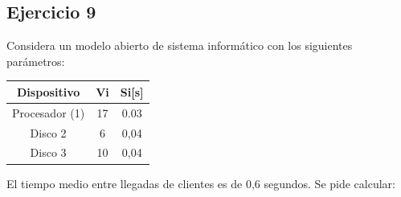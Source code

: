 \subsection{Ejercicio 9}
Considera un modelo abierto de sistema informático con los siguientes parámetros:
\begin{table}[H]\centering\begin{tabular}{|c|c|c|}\hline
\textbf{Dispositivo}    & \textbf{Vi} & \textbf{Si[s]} \\ \hline
Procesador (1) & 17 & 0.03   \\ \hline
Disco 2        & 6  & 0,04   \\ \hline
Disco 3        & 10 & 0,04   \\ \hline
\end{tabular}\end{table}
El tiempo medio entre llegadas de clientes es de 0,6 segundos. Se pide calcular:
